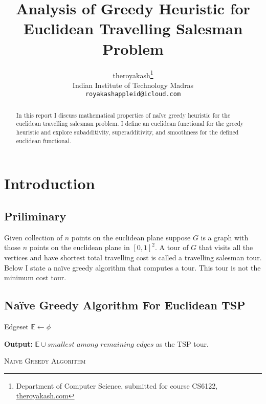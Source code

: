 \documentclass{article}
\title{Analysis of Greedy Heuristic for Euclidean Travelling Salesman Problem}
\author{
    theroyakash\thanks{\textsf{Department of Computer Science, submitted for course} \textsf{CS6122}, \href{https://theroyakash.com}{\textsf{theroyakash.com}}}\\
    Indian Institute of Technology Madras \\
    \texttt{royakashappleid@icloud.com} \\
}
\begin{document}
\maketitle

\begin{abstract}
    In this report I discuss mathematical properties of
    naïve greedy heuristic for the euclidean travelling salesman problem.
    I define an euclidean functional for the greedy heuristic and explore
    subadditivity, superadditivity, and smoothness for the defined
    euclidean functional.
\end{abstract}

\section{Introduction}
\subsection{Priliminary}
Given collection of $n$ points on the euclidean plane suppose $G$ is a graph
with those $n$ points on the euclidean plane in $[0,1]^2$. A tour of $G$ that
visits all the vertices and have shortest total travelling cost is called a
travelling salesman tour. Below I state a naïve greedy algorithm that computes
a tour. This tour is not the minimum cost tour.

\subsection{Naïve Greedy Algorithm For Euclidean TSP}

\begin{algorithm}[H]\label{alg:1}

    \BlankLine
    Edgeset $\mathbb{E} \gets \phi$\\

    \textbf{Output:} $\mathbb{E} \cup \textit{smallest among remaining edges}$ as the TSP tour.

    \caption{\textsc{Naive Greedy Algorithm}}
\end{algorithm}
\end{document}
